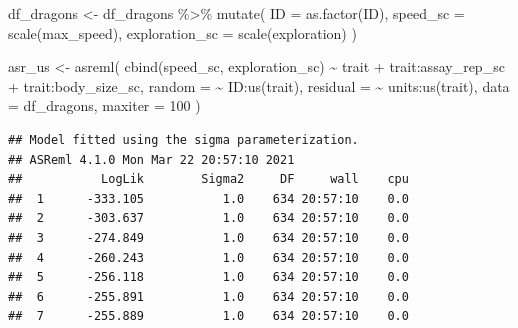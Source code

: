 \documentclass[
  12pt,
]{book}
\newenvironment{Shaded}{\begin{snugshade}}{\end{snugshade}}
\newcommand{\AttributeTok}[1]{\textcolor[rgb]{0.77,0.63,0.00}{#1}}
\newcommand{\DecValTok}[1]{\textcolor[rgb]{0.00,0.00,0.81}{#1}}
\newcommand{\FunctionTok}[1]{\textcolor[rgb]{0.00,0.00,0.00}{#1}}
\newcommand{\NormalTok}[1]{#1}
\newcommand{\OtherTok}[1]{\textcolor[rgb]{0.56,0.35,0.01}{#1}}
\newcommand{\SpecialCharTok}[1]{\textcolor[rgb]{0.00,0.00,0.00}{#1}}
\begin{document}
\begin{Shaded}
\begin{Highlighting}[]
\NormalTok{df\_dragons }\OtherTok{\textless{}{-}}\NormalTok{ df\_dragons }\SpecialCharTok{\%\textgreater{}\%}
  \FunctionTok{mutate}\NormalTok{(}
    \AttributeTok{ID =} \FunctionTok{as.factor}\NormalTok{(ID),}
    \AttributeTok{speed\_sc =} \FunctionTok{scale}\NormalTok{(max\_speed),}
    \AttributeTok{exploration\_sc =} \FunctionTok{scale}\NormalTok{(exploration)}
\NormalTok{  )}

\NormalTok{asr\_us }\OtherTok{\textless{}{-}} \FunctionTok{asreml}\NormalTok{(}
  \FunctionTok{cbind}\NormalTok{(speed\_sc, exploration\_sc) }\SpecialCharTok{\textasciitilde{}}\NormalTok{ trait }\SpecialCharTok{+}
\NormalTok{    trait}\SpecialCharTok{:}\NormalTok{assay\_rep\_sc }\SpecialCharTok{+}\NormalTok{ trait}\SpecialCharTok{:}\NormalTok{body\_size\_sc,}
  \AttributeTok{random =} \SpecialCharTok{\textasciitilde{}}\NormalTok{ ID}\SpecialCharTok{:}\FunctionTok{us}\NormalTok{(trait),}
  \AttributeTok{residual =} \SpecialCharTok{\textasciitilde{}}\NormalTok{ units}\SpecialCharTok{:}\FunctionTok{us}\NormalTok{(trait),}
  \AttributeTok{data =}\NormalTok{ df\_dragons,}
  \AttributeTok{maxiter =} \DecValTok{100}
\NormalTok{)}
\end{Highlighting}
\end{Shaded}

\begin{verbatim}
## Model fitted using the sigma parameterization.
## ASReml 4.1.0 Mon Mar 22 20:57:10 2021
##           LogLik        Sigma2     DF     wall    cpu
##  1      -333.105           1.0    634 20:57:10    0.0
##  2      -303.637           1.0    634 20:57:10    0.0
##  3      -274.849           1.0    634 20:57:10    0.0
##  4      -260.243           1.0    634 20:57:10    0.0
##  5      -256.118           1.0    634 20:57:10    0.0
##  6      -255.891           1.0    634 20:57:10    0.0
##  7      -255.889           1.0    634 20:57:10    0.0
\end{verbatim}
\end{document}
